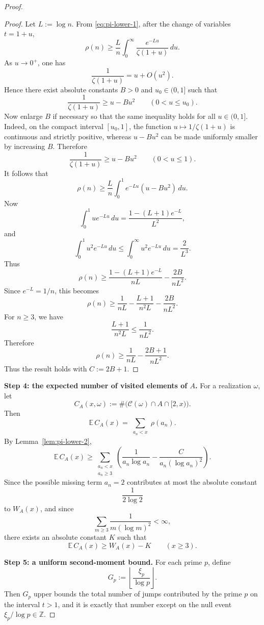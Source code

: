 \documentclass[11pt,letterpaper,reqno]{amsart}
\theoremstyle{definition}
\numberwithin{equation}{section}
\newcommand{\1}{\mathbf 1}
\begin{document}
\begin{proof}
\begin{proof}
Let \(L:=\log n\). From \eqref{eq:pi-lower-1}, after the change of variables \(t=1+u\),
\[
\rho(n)\ge \frac{L}{n}\int_0^\infty \frac{e^{-Lu}}{\zeta(1+u)}\,du.
\]
As \(u\to 0^+\), one has
\[
\frac1{\zeta(1+u)}=u+O(u^2).
\]
Hence there exist absolute constants \(B>0\) and \(u_0\in(0,1]\) such that
\[
\frac1{\zeta(1+u)}\ge u-Bu^2
\qquad (0<u\le u_0).
\]
Now enlarge \(B\) if necessary so that the same inequality holds for all \(u\in(0,1]\). Indeed, on the compact interval \([u_0,1]\), the function \(u\mapsto 1/\zeta(1+u)\) is continuous and strictly positive, whereas \(u-Bu^2\) can be made uniformly smaller by increasing \(B\). Therefore
\[
\frac1{\zeta(1+u)}\ge u-Bu^2
\qquad (0<u\le 1).
\]
It follows that
\[
\rho(n)\ge \frac{L}{n}\int_0^1 e^{-Lu}(u-Bu^2)\,du.
\]
Now
\[
\int_0^1 ue^{-Lu}\,du
=
\frac{1-(L+1)e^{-L}}{L^2},
\]
and
\[
\int_0^1 u^2e^{-Lu}\,du\le \int_0^\infty u^2e^{-Lu}\,du=\frac{2}{L^3}.
\]
Thus
\[
\rho(n)\ge
\frac{1-(L+1)e^{-L}}{nL}-\frac{2B}{nL^2}.
\]
Since \(e^{-L}=1/n\), this becomes
\[
\rho(n)\ge
\frac{1}{nL}-\frac{L+1}{n^2L}-\frac{2B}{nL^2}.
\]
For \(n\ge 3\), we have
\[
\frac{L+1}{n^2L}\le \frac{1}{nL^2}.
\]
Therefore
\[
\rho(n)\ge \frac{1}{nL}-\frac{2B+1}{nL^2}.
\]
Thus the result holds with \(C:=2B+1\).
\end{proof}

\medskip

\noindent
{\bf Step 4: the expected number of visited elements of $A$.}
For a realization $\omega$, let
\[
C_A(x,\omega):=\#\bigl(\mathcal C(\omega)\cap A\cap [2,x)\bigr).
\]
Then
\[
\mathbb E\,C_A(x)=\sum_{\substack{a_n<x}}\rho(a_n).
\]
By Lemma~\ref{lem:pi-lower-2},
\[
\mathbb E\,C_A(x)
\ge
\sum_{\substack{a_n<x\\ a_n\ge 3}}
\left(
\frac{1}{a_n\log a_n}
-
\frac{C}{a_n(\log a_n)^2}
\right).
\]
Since the possible missing term \(a_n=2\) contributes at most the absolute constant
\[
\frac{1}{2\log 2}
\]
to \(W_A(x)\), and since
\[
\sum_{m\ge 3}\frac{1}{m(\log m)^2}<\infty,
\]
there exists an absolute constant \(K\) such that
\begin{equation}\label{eq:EC-lower}
\mathbb E\,C_A(x)\ge W_A(x)-K
\qquad (x\ge 3).
\end{equation}


\medskip

\noindent
{\bf Step 5: a uniform second-moment bound.}
For each prime \(p\), define
\[
G_p:=\left\lfloor \frac{\xi_p}{\log p}\right\rfloor.
\]
Then \(G_p\) upper bounds the total number of jumps contributed by the prime \(p\) on the interval \(t>1\), and it is exactly that number except on the null event \(\xi_p/\log p\in\mathbb Z\).


\end{proof}
\end{document}
